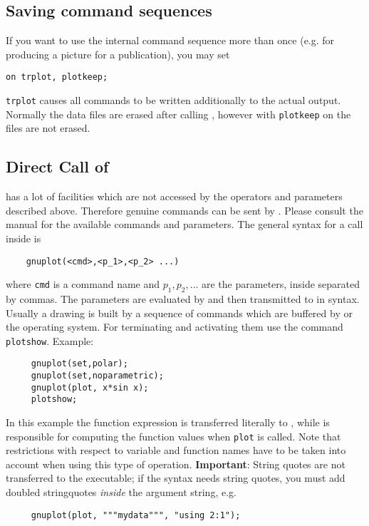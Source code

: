 \subsection{Saving {\Gnuplot} command sequences}
If you want to use the internal {\Gnuplot} command sequence more than once
(e.g. for producing a picture for a publication), you may set
\begin{verbatim}
on trplot, plotkeep;
\end{verbatim}
\texttt{trplot} causes all {\Gnuplot} commands to be written additionally to the
actual {\REDUCE} output.  Normally the data files are erased after calling
{\Gnuplot}, however with \texttt{plotkeep} on the files are not erased.


\subsection{Direct Call of {\Gnuplot}}

{\Gnuplot} has a lot of facilities which are not accessed by the operators and
parameters described above. Therefore genuine {\Gnuplot} commands can be sent by
{\REDUCE}.  Please consult the {\Gnuplot} manual for the available commands and
parameters. The general syntax for a {\Gnuplot} call inside {\REDUCE} is
\begin{verbatim}
    gnuplot(<cmd>,<p_1>,<p_2> ...)
\end{verbatim}
where \texttt{cmd} is a command name and $p_1,p_2, \ldots$ are the parameters,
inside {\REDUCE} separated by commas. The parameters are evaluated by {\REDUCE}
and then transmitted to {\Gnuplot} in {\Gnuplot} syntax. Usually a drawing is built by
a sequence of commands which are buffered by {\REDUCE} or the operating
system. For terminating and activating them use the {\REDUCE}
command \texttt{plotshow}.  Example:
\begin{verbatim}
     gnuplot(set,polar);
     gnuplot(set,noparametric);
     gnuplot(plot, x*sin x);
     plotshow;
\end{verbatim}
In this example the function expression is transferred literally to {\Gnuplot},
while {\REDUCE} is responsible for computing the function values
when \texttt{plot} is called.  Note that {\Gnuplot} restrictions with respect to
variable and function names have to be taken into account when using this type
of operation. \textbf{Important}: String quotes are not transferred to the {\Gnuplot}
executable; if the {\Gnuplot} syntax needs string quotes, you must add doubled
stringquotes \emph{inside} the argument string, e.g.
\begin{verbatim}
     gnuplot(plot, """mydata""", "using 2:1");
\end{verbatim}


